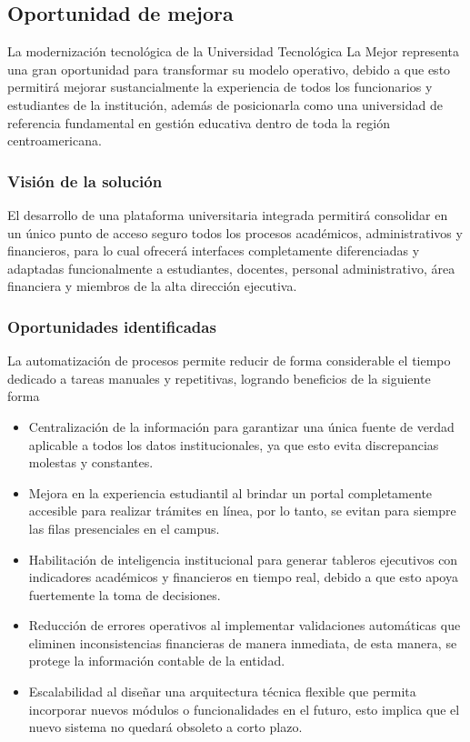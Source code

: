 \documentclass[11pt,spanish]{article}
\begin{document}
\subsection{Oportunidad de mejora}

La modernización tecnológica de la Universidad Tecnológica La Mejor representa una gran oportunidad para transformar su modelo operativo, debido a que esto permitirá mejorar sustancialmente la experiencia de todos los funcionarios y estudiantes de la institución, además de posicionarla como una universidad de referencia fundamental en gestión educativa dentro de toda la región centroamericana.

\subsubsection{Visión de la solución}

El desarrollo de una plataforma universitaria integrada permitirá consolidar en un único punto de acceso seguro todos los procesos académicos, administrativos y financieros, para lo cual ofrecerá interfaces completamente diferenciadas y adaptadas funcionalmente a estudiantes, docentes, personal administrativo, área financiera y miembros de la alta dirección ejecutiva.

\subsubsection{Oportunidades identificadas}

La automatización de procesos permite reducir de forma considerable el tiempo dedicado a tareas manuales y repetitivas, logrando beneficios de la siguiente forma

\begin{itemize}
    \item Centralización de la información para garantizar una única fuente de verdad aplicable a todos los datos institucionales, ya que esto evita discrepancias molestas y constantes.
    \item Mejora en la experiencia estudiantil al brindar un portal completamente accesible para realizar trámites en línea, por lo tanto, se evitan para siempre las filas presenciales en el campus.
    \item Habilitación de inteligencia institucional para generar tableros ejecutivos con indicadores académicos y financieros en tiempo real, debido a que esto apoya fuertemente la toma de decisiones.
    \item Reducción de errores operativos al implementar validaciones automáticas que eliminen inconsistencias financieras de manera inmediata, de esta manera, se protege la información contable de la entidad.
    \item Escalabilidad al diseñar una arquitectura técnica flexible que permita incorporar nuevos módulos o funcionalidades en el futuro, esto implica que el nuevo sistema no quedará obsoleto a corto plazo.
\end{itemize}
\end{document}
